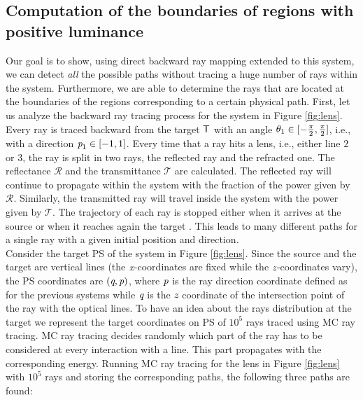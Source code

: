 \subsection{Computation of the boundaries of regions with positive luminance}
Our goal is to show, using direct backward ray mapping extended to this system, we can detect \textit{all} the possible paths without tracing a huge number of rays within the system. Furthermore, we are able to determine the rays that are located at the boundaries of the regions corresponding to a certain physical path.
First, let us analyze the backward ray tracing process for the system in Figure \ref{fig:lens}. Every ray is traced backward from the target $\textsf{T}$ with an angle $\theta_1\in[-\frac{\pi}{2}, \frac{\pi}{2}]$, i.e., with a direction $\textit{p}_1\in[-1,1]$. Every time that a ray hits a lens, i.e., either line $2$ or $3$, the ray is split in two rays, the reflected ray and the refracted one. The reflectance $\mathcal{R}$ and the transmittance $\mathcal{T}$ are calculated. The reflected ray will continue to propagate within the system with the fraction of the power given by $\mathcal{R}$. Similarly, the transmitted ray will travel inside the system with the power given by $\mathcal{T}$. The trajectory of each ray is stopped either when it arrives at the source  or when it reaches again the target . This leads to many different paths for a single ray with a given initial position and direction. 
\\ \indent
Consider the target PS of the system in Figure \ref{fig:lens}. Since the source and the target are vertical lines (the $\textit{x}$-coordinates are fixed while the $\textit{z}$-coordinates vary), the PS coordinates are $(\textit{q}, \textit{p})$, where  $\textit{p}$ is the ray direction coordinate defined as for the previous systems while $\textit{q}$ is the $\textit{z}$ coordinate of the intersection point of the ray with the optical lines. To have an idea about the rays distribution at the target we represent the target coordinates on PS of $10^5$ rays traced using MC ray tracing. MC ray tracing decides randomly which part of the ray has to be considered at every interaction with a line. This part propagates with the corresponding energy. Running MC ray tracing for the lens in Figure \ref{fig:lens} with $10^5$ rays and storing the corresponding paths, the following three paths are found:
